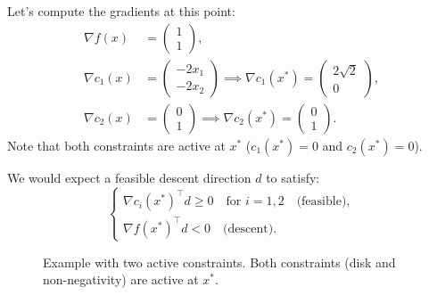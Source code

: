 Let's compute the gradients at this point:
\begin{align*}
    \nabla f(x) &= \begin{pmatrix} 1 \\ 1 \end{pmatrix}, \\
    \nabla c_1(x) &= \begin{pmatrix} -2x_1 \\ -2x_2 \end{pmatrix} \implies \nabla c_1(x^*) = \begin{pmatrix} 2\sqrt{2} \\ 0 \end{pmatrix}, \\
    \nabla c_2(x) &= \begin{pmatrix} 0 \\ 1 \end{pmatrix} \implies \nabla c_2(x^*) = \begin{pmatrix} 0 \\ 1 \end{pmatrix}.
\end{align*}
Note that both constraints are active at $x^*$ ($c_1(x^*) = 0$ and $c_2(x^*) = 0$).

We would expect a feasible descent direction $d$ to satisfy:
\begin{equation}
    \begin{cases}
        \nabla c_i(x^*)^\top d \ge 0 \quad \text{for } i=1, 2 \quad \text{(feasible)}, \\
        \nabla f(x^*)^\top d < 0 \quad \text{(descent)}.
    \end{cases}
\end{equation}

\begin{figure}[H]
\centering
{}
\caption{Example with two active constraints. Both constraints (disk and non-negativity) are active at $x^*$.}
\label{fig:ex-two-inequalities}
\end{figure}

